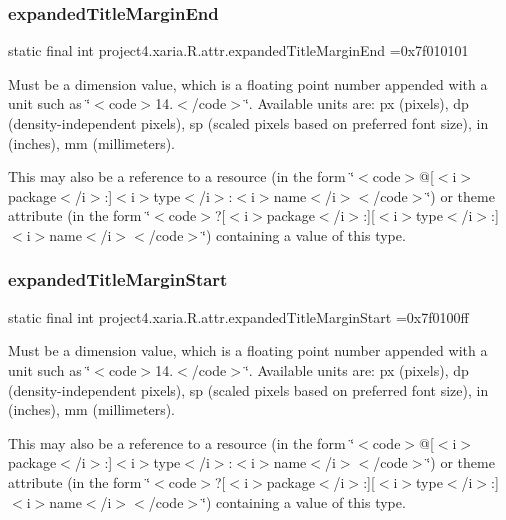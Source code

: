 \subsubsection{\texorpdfstring{expanded\+Title\+Margin\+End}{expandedTitleMarginEnd}}
{\footnotesize\ttfamily static final int project4.\+xaria.\+R.\+attr.\+expanded\+Title\+Margin\+End =0x7f010101\hspace{0.3cm}{\ttfamily [static]}}

Must be a dimension value, which is a floating point number appended with a unit such as \char`\"{}$<$code$>$14.\+5sp$<$/code$>$\char`\"{}. Available units are\+: px (pixels), dp (density-\/independent pixels), sp (scaled pixels based on preferred font size), in (inches), mm (millimeters). 

This may also be a reference to a resource (in the form \char`\"{}$<$code$>$@\mbox{[}$<$i$>$package$<$/i$>$\+:\mbox{]}$<$i$>$type$<$/i$>$\+:$<$i$>$name$<$/i$>$$<$/code$>$\char`\"{}) or theme attribute (in the form \char`\"{}$<$code$>$?\mbox{[}$<$i$>$package$<$/i$>$\+:\mbox{]}\mbox{[}$<$i$>$type$<$/i$>$\+:\mbox{]}$<$i$>$name$<$/i$>$$<$/code$>$\char`\"{}) containing a value of this type. \mbox{\label{classproject4_1_1xaria_1_1R_1_1attr_aaf283223bf13dd58c7a2a9f92e6345f7}} 
\subsubsection{\texorpdfstring{expanded\+Title\+Margin\+Start}{expandedTitleMarginStart}}
{\footnotesize\ttfamily static final int project4.\+xaria.\+R.\+attr.\+expanded\+Title\+Margin\+Start =0x7f0100ff\hspace{0.3cm}{\ttfamily [static]}}

Must be a dimension value, which is a floating point number appended with a unit such as \char`\"{}$<$code$>$14.\+5sp$<$/code$>$\char`\"{}. Available units are\+: px (pixels), dp (density-\/independent pixels), sp (scaled pixels based on preferred font size), in (inches), mm (millimeters). 

This may also be a reference to a resource (in the form \char`\"{}$<$code$>$@\mbox{[}$<$i$>$package$<$/i$>$\+:\mbox{]}$<$i$>$type$<$/i$>$\+:$<$i$>$name$<$/i$>$$<$/code$>$\char`\"{}) or theme attribute (in the form \char`\"{}$<$code$>$?\mbox{[}$<$i$>$package$<$/i$>$\+:\mbox{]}\mbox{[}$<$i$>$type$<$/i$>$\+:\mbox{]}$<$i$>$name$<$/i$>$$<$/code$>$\char`\"{}) containing a value of this type. \mbox{\label{classproject4_1_1xaria_1_1R_1_1attr_a10e91e433b7cbdb102ab95bd92373df7}} 
